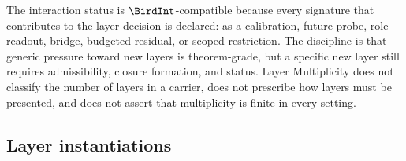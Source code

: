 \documentclass[11pt]{article}
\theoremstyle{definition}
\begin{document}
The interaction status is \(\BirdInt\)-compatible because every
signature that contributes to the layer decision is declared: as a
calibration, future probe, role readout, bridge, budgeted residual,
or scoped restriction.  The discipline is that generic pressure
toward new layers is theorem-grade, but a specific new layer still
requires admissibility, closure formation, and status.
Layer Multiplicity does not classify the number of layers in a
carrier, does not prescribe how layers must be presented, and does
not assert that multiplicity is finite in every setting.

\subsection*{Layer instantiations}\label{layer-inst:F24}
\end{document}
